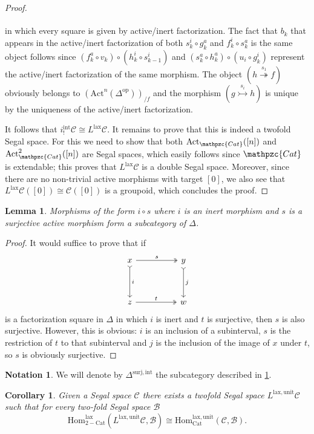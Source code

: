\documentclass[a4paper, reqno]{amsart}
\newtheorem{cor}[theorem]{Corollary}
\newtheorem{lemma}[theorem]{Lemma}
\theoremstyle{definition}
\newtheorem{notation}[theorem]{Notation}
\newcommand\cB{\mathscr B}
\newcommand\cC{\mathscr C}
\newcommand\mor{\mathrm{Hom}}
\newcommand\op{\mathrm{op}}
\newcommand\cat{\mathrm{Cat}}
\newcommand\ccat{\mathpzc{Cat}}
\newcommand\lax{\mathrm{lax}}
\newcommand\un{\mathrm{unit}}
\newcommand\sur{\mathrm{surj}}
\newcommand\Act{\mathrm{Act}}
\newcommand\inrt{\mathrm{int}}
\begin{document}
\begin{proof}
\[\begin{tikzcd}[row sep=huge,column sep=huge]
\end{tikzcd}
\]
in which every square is given by active/inert factorization. The fact that $b_k$ that appears in the active/inert factorization of both $s^i_k\circ g^a_k$ and $f^i_k\circ s^a_k$ is the same object follows since $(f^a_k\circ v_k)\circ(h^i_k\circ s^i_{k-1})$ and $(s_k^a\circ h^a_k)\circ(u_i\circ g^i_k)$ represent the active/inert factorization of the same morphism. The object $(h\overset{s_1}{\twoheadrightarrow}f)$ obviously belongs to $(\Act^n(\Delta^\op))_{/f}$ and the morphism $(g\overset{s_i}{\rightarrowtail}h)$ is unique by the uniqueness of the active/inert factorization.\par
It follows that $i^\inrt_! \cC\cong L^\lax\cC$. It remains to prove that this is indeed a twofold Segal space. For this we need to show that both $\Act_\ccat([n])$ and $\Act^2_\ccat([n])$ are Segal spaces, which easily follows since $\ccat$ is extendable; this proves that $L^\lax\cC$ is a double Segal space. Moreover, since there are no non-trivial active morphisms with target $[0]$, we also see that $L^\lax\cC([0])\cong \cC([0])$ is a groupoid, which concludes the proof.
\end{proof}
\begin{lemma}\label{lem:int_sur}
Morphisms of the form $i\circ s$ where $i$ is an inert morphism and $s$ is a surjective active morphism form a subcategory of $\Delta$.
\end{lemma}
\begin{proof}
It would suffice to prove that if 
\[
\begin{tikzcd}[row sep=huge, column sep=huge]
x\arrow[d, tail, "i"]\arrow[r, two heads, "s"]&y\arrow[d, tail, "j"]\\
z\arrow[r, two heads, "t"]&w
\end{tikzcd}
\]
is a factorization square in $\Delta$ in which $i$ is inert and $t$ is surjective, then $s$ is also surjective. However, this is obvious: $i$ is an inclusion of a subinterval, $s$ is the restriction of $t$ to that subinterval and $j$ is the inclusion of the image of $x$ under $t$, so $s$ is obviously surjective.
\end{proof}
\begin{notation}
We will denote by $\Delta^{\sur,\inrt}$ the subcategory described in \cref{lem:int_sur}.
\end{notation}
\begin{cor}\label{cor:unilax}
Given a Segal space $\cC$ there exists a twofold Segal space $L^{\lax,\un}\cC$ such that for every two-fold Segal space $\cB$
\[\mor^\lax_{2-\cat}(L^{\lax,\un}\cC,\cB)\cong \mor_\cat^{\lax,\un}(\cC,\cB).\]
\end{cor}
\end{document}
